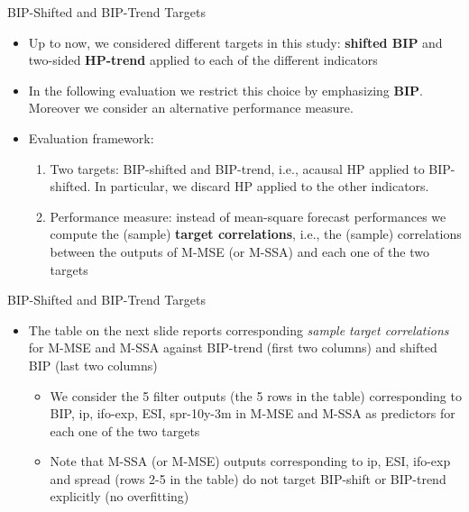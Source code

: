 \documentclass{beamer}
\begin{document}
\begin{frame} {BIP-Shifted and BIP-Trend Targets}
\begin{itemize}
\item Up to now, we considered different targets in this study: \textbf{shifted BIP} and two-sided \textbf{HP-trend}  applied to each of the different indicators
\item In the following {evaluation} we restrict this choice by emphasizing \textbf{BIP}. Moreover we consider an alternative performance measure.
\item Evaluation framework:
\begin{enumerate}
\item Two targets: BIP-shifted and BIP-trend, i.e., acausal HP applied to BIP-shifted. In particular, we discard HP applied to the other indicators.
\item Performance measure: instead of mean-square forecast performances we compute the (sample) \textbf{target correlations}, i.e., the (sample) correlations between the outputs of M-MSE (or M-SSA) and each one of the two targets
\end{enumerate}
\end{itemize}
\end{frame}


\begin{frame} {BIP-Shifted and BIP-Trend Targets}
\begin{itemize}
\item The table on the next slide reports corresponding \emph{sample target correlations} for M-MSE and M-SSA against BIP-trend (first two columns) and shifted BIP (last two columns)
\begin{itemize}
\item We consider the 5 filter outputs (the 5 rows in the table) corresponding to BIP, ip, ifo-exp, ESI, spr-10y-3m  in M-MSE and M-SSA as predictors for each one of the two targets
\item Note that M-SSA (or M-MSE) outputs corresponding to ip, ESI, ifo-exp and spread (rows 2-5 in the table) do not target BIP-shift or BIP-trend explicitly (no overfitting) 
\end{itemize}
\end{itemize}
\end{frame}
\end{document}
